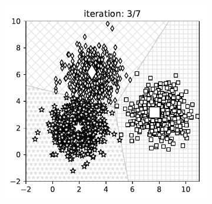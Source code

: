 \begin{figure}[t]
\begin{subfigure}{0.325\textwidth}
\end{subfigure}
\begin{subfigure}{0.325\textwidth}
\includegraphics[width=0.99\linewidth]{ebookML_src/src/kmeans/ex_2.pdf}
\end{subfigure}


\end{figure}
